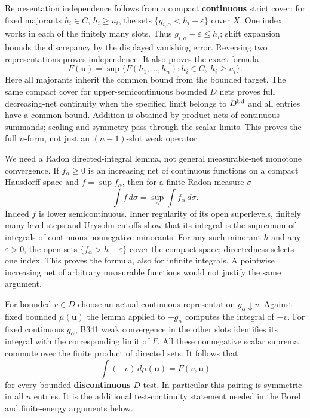 \documentclass[
]{article}
\begin{document}
Representation independence follows from a compact \textbf{continuous}
strict cover: for fixed majorants \(h_i\in C\), \(h_i\ge u_i\), the sets
\(\{g_{i,\alpha}<h_i+\varepsilon\}\) cover \(X\). One index works in
each of the finitely many slots. Thus
\(g_{i,\alpha}-\varepsilon\le h_i\); shift expansion bounds the
discrepancy by the displayed vanishing error. Reversing two
representations proves independence. It also proves the exact formula
\[F(\boldsymbol u)=\sup\{F(h_1,\ldots,h_n):h_i\in C,\ h_i\ge u_i\}.\]
Here all majorants inherit the common bound from the bounded target. The
same compact cover for upper-semicontinuous bounded \(D\) nets proves
full decreasing-net continuity when the specified limit belongs to
\(D^{\rm bd}\) and all entries have a common bound. Addition is obtained
by product nets of continuous summands; scaling and symmetry pass
through the scalar limits. This proves the full \(n\)-form, not just an
\((n-1)\)-slot weak operator.

We need a Radon directed-integral lemma, not general measurable-net
monotone convergence. If \(f_\alpha\ge0\) is an increasing net of
continuous functions on a compact Hausdorff space and
\(f=\sup f_\alpha\), then for a finite Radon measure \(\sigma\)
\[\int f\,d\sigma=\sup_\alpha\int f_\alpha\,d\sigma.\] Indeed \(f\) is
lower semicontinuous. Inner regularity of its open superlevels, finitely
many level steps and Urysohn cutoffs show that its integral is the
supremum of integrals of continuous nonnegative minorants. For any such
minorant \(h\) and any \(\varepsilon>0\), the open sets
\(\{f_\alpha>h-\varepsilon\}\) cover the compact space; directedness
selects one index. This proves the formula, also for infinite integrals.
A pointwise increasing net of arbitrary measurable functions would not
justify the same argument.

For bounded \(v\in D\) choose an actual continuous representation
\(g_\alpha\downarrow v\). Against fixed bounded \(\mu(\boldsymbol u)\)
the lemma applied to \(-g_\alpha\) computes the integral of \(-v\). For
fixed continuous \(g_\alpha\), B341 weak convergence in the other slots
identifies its integral with the corresponding limit of \(F\). All these
nonnegative scalar suprema commute over the finite product of directed
sets. It follows that
\[\int(-v)\,d\mu(\boldsymbol u)=F(v,\boldsymbol u)\] for every bounded
\textbf{discontinuous} \(D\) test. In particular this pairing is
symmetric in all \(n\) entries. It is the additional test-continuity
statement needed in the Borel and finite-energy arguments below.
\end{document}
